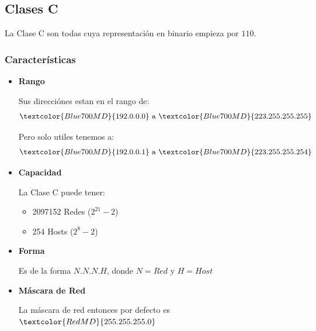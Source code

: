 \documentclass[12pt, fleqn]{report}                             %
\theoremstyle{break}                                            %
\newcommand{\Color}[2]{\textcolor{#1}{#2}}                      %
\begin{document}
            \clearpage
            \subsection{Clases C}

                La Clase C son todas cuya representación en binario empieza por $110$.

                \subsubsection{Características}
                
                \begin{itemize}
                    \item 
                        \textbf{Rango}

                        Sus direcciónes estan en el rango de:
                        \begin{equation*}
                            \Color{Blue700MD}{192.0.0.0}
                            \text{ a }
                            \Color{Blue700MD}{223.255.255.255}
                        \end{equation*}

                        Pero solo utiles tenemos a:
                        \begin{equation*}
                            \Color{Blue700MD}{192.0.0.1}
                            \text{ a }
                            \Color{Blue700MD}{223.255.255.254}
                        \end{equation*}

                    \item
                        \textbf{Capacidad}

                            La Clase C puede tener:
                            \begin{itemize}
                                \item 2097152 Redes ($2^{21} - 2$)
                                \item 254 Hosts ($2^{8} - 2$)
                            \end{itemize}

                    \item
                        \textbf{Forma}

                            Es de la forma $N.N.N.H$, donde $N = Red$ y $H = Host$

                    \item
                        \textbf{Máscara de Red}

                            La máscara de red entonces por defecto es $\Color{RedMD}{255.255.255.0}$


                \end{itemize}
\end{document}
